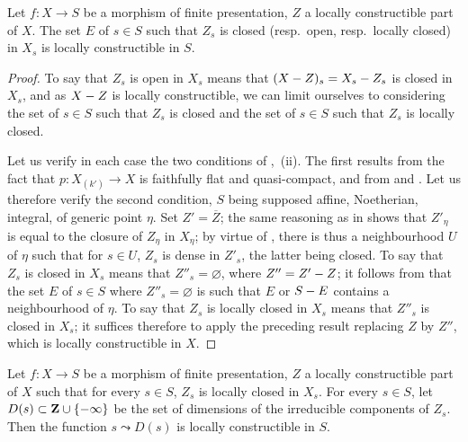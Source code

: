 \begin{corollary}[9.5.4]
\label{IV.9.5.4}
Let $f:X\to S$ be a morphism of finite presentation, $Z$ a locally constructible part of $X$.
The set $E$ of $s\in S$ such that $Z_s$ is closed (resp.\ open, \textup{resp.}\ locally closed) in $X_s$ is locally constructible in $S$.
\end{corollary}

\begin{proof}
To say that $Z_s$ is open in $X_s$ means that $(X- Z)_s=X_s- Z_s$ is closed in $X_s$, and as $X- Z$ is locally constructible, we can limit ourselves to considering the set of $s\in S$ such that $Z_s$ is closed and the set of $s\in S$ such that $Z_s$ is locally closed.

Let us verify in each case the two conditions of ,~(ii).
The first results from the fact that $p:X_{(k')}\to X$ is faithfully flat and quasi-compact, and from  and .
Let us therefore verify the second condition, $S$ being supposed affine, Noetherian, integral, of generic point $\eta$.
Set $Z'=\overline{Z}$; the same reasoning as in  shows that $Z'_\eta$ is equal to the closure of $Z_\eta$ in $X_\eta$; by virtue of , there is thus a neighbourhood $U$ of $\eta$ such that for $s\in U$, $Z_s$ is dense in $Z'_s$, the latter being closed.
To say that $Z_s$ is closed in $X_s$ means that $Z''_s=\varnothing$, where $Z''=Z'- Z$; it follows from  that the set $E$ of $s\in S$ where $Z''_s=\varnothing$ is such that $E$ or $S- E$ contains a neighbourhood of $\eta$.
To say that $Z_s$ is locally closed in $X_s$ means that $Z''_s$ is closed in $X_s$; it suffices therefore to apply the preceding result replacing $Z$ by $Z''$, which is locally constructible in $X$.
\end{proof}


\begin{proposition}[9.5.5]
\label{IV.9.5.5}
Let $f:X\to S$ be a morphism of finite presentation, $Z$ a locally constructible part of $X$ such that for every $s\in S$, $Z_s$ is locally closed in $X_s$.
For every $s\in S$, let $D(s)\subset\mathbf{Z}\cup\{-\infty\}$ be the set of dimensions of the irreducible components of $Z_s$.
Then the function $s\leadsto D(s)$ is locally constructible in $S$.
\end{proposition}

